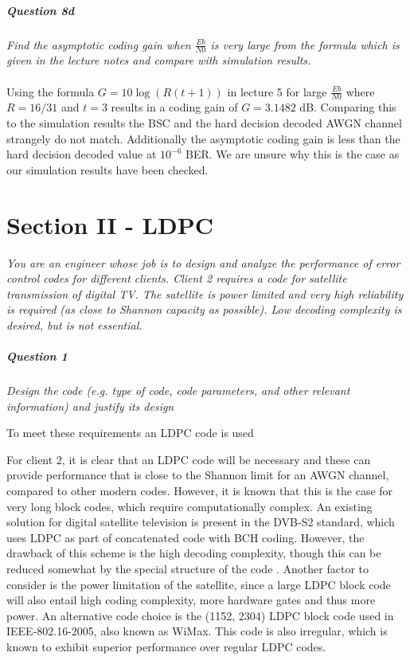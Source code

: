 \documentclass[a4paper]{article}
\begin{document}
\subsubsection{Question 8d} \textit{Find the asymptotic coding gain when $\frac{Eb}{N0}$ is very large from the formula which is given in the lecture notes and compare with simulation results.} \\
\\
Using the formula $G = 10\log(R(t+1))$ in lecture 5 for large $\frac{Eb}{N0}$ where $R = 16/31$ and $t = 3$ results in a coding gain of $G = 3.1482$ dB. Comparing this to the simulation results the BSC and the hard decision decoded AWGN channel strangely do not match. Additionally the asymptotic coding gain is less than the hard decision decoded value at $10^{-6}$ BER. We are unsure why this is the case as our simulation results have been checked.\\


\hrulefill
\newpage

\part*{Section II - LDPC}


\textit{You are an engineer whose job is to design and analyze the performance of error control codes for different clients. Client 2 requires a code for satellite transmission of digital TV. The satellite is power limited and very high reliability is required (as close to Shannon capacity as possible). Low decoding complexity is desired, but is not essential.} 

\subsubsection{Question 1} \textit{Design the code (e.g. type of code, code parameters, and other relevant information) and justify its design}

To meet these requirements an LDPC code is used

For client 2, it is clear that an LDPC code will be necessary and these can provide performance that is close to the Shannon limit for an AWGN channel, compared to other modern codes. However, it is known that this is the case for very long block codes, which require computationally complex.
An existing solution for digital satellite television is present in the DVB-S2
standard, which uses LDPC as part of concatenated code with BCH coding\cite{morello2006dvb}. However,
the drawback of this scheme is the high decoding complexity, though this can be 
reduced somewhat by the special structure of the code . Another factor to consider is the power limitation of the satellite, since a large LDPC block code will also entail high coding complexity, more hardware gates and thus more power. An alternative code choice
is the (1152, 2304) LDPC block code used in IEEE-802.16-2005, also known as WiMax. This code is also irregular, which is known to exhibit superior performance over regular LDPC codes.
\end{document}
